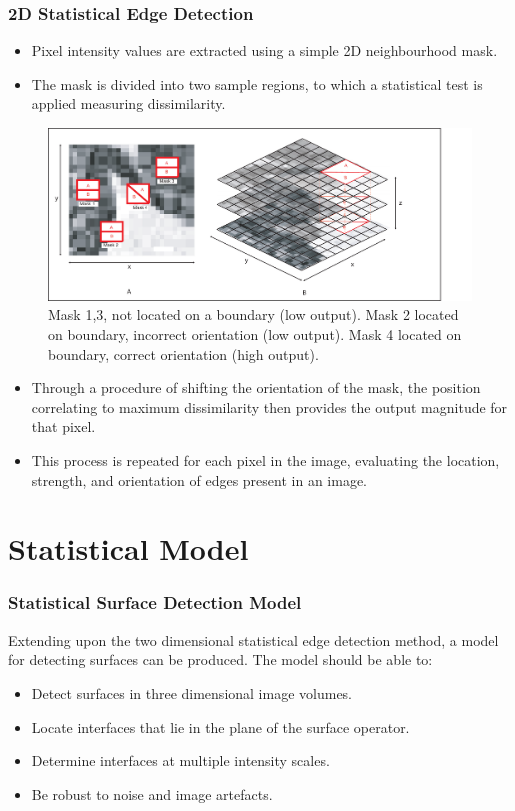 \documentclass[9pt]{beamer}
\begin{document}
\begin{frame}[shrink]
	\frametitle{ 2D Statistical Edge Detection}
		\begin{multicols}{2}
			\begin{itemize}
				\item Pixel intensity values are extracted using a simple 2D neighbourhood mask. 
				\item The mask is divided into two sample regions, to which a statistical test is applied measuring dissimilarity.
			 \end{itemize}
		 \begin{figure}
			\includegraphics[scale=0.35]{2D3Dmasks1}
			\caption{ Mask 1,3, not located on a boundary (low output). Mask 2 located on boundary, incorrect orientation (low output). Mask 4 located on boundary, correct orientation (high output).}
		 \end{figure}
		 \begin{itemize}
		 	\item Through a procedure of shifting the orientation of the mask, the position correlating to maximum dissimilarity then provides the output magnitude for that pixel.
		 	\item This process is repeated for each pixel in the image, evaluating the location, strength, and orientation of edges present in an image.
		 \end{itemize}
	\end{multicols}
 \end{frame}
\section{Statistical Model}
\begin{frame}
	\frametitle{Statistical Surface Detection Model}
Extending upon the two dimensional statistical edge detection method, a model for detecting surfaces can be produced.
The model should be able to:
			\begin{itemize}
					\item Detect surfaces in three dimensional image volumes.
					\item Locate interfaces that lie in the plane of the surface operator.
					\item Determine interfaces at multiple intensity scales.
					\item Be robust to noise and image artefacts. 
			\end{itemize} 
	\end{frame}
\end{document}
